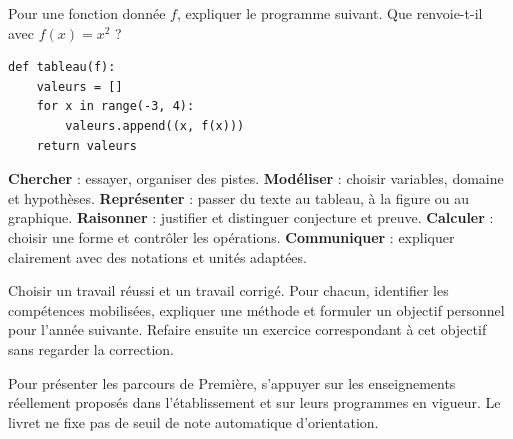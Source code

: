 \begin{example}Pour une fonction donnée $f$, expliquer le programme suivant. Que renvoie-t-il avec $f(x)=x^2$ ?\end{example}
\begin{lstlisting}
def tableau(f):
    valeurs = []
    for x in range(-3, 4):
        valeurs.append((x, f(x)))
    return valeurs
\end{lstlisting}
\begin{keypoint}
\textbf{Chercher} : essayer, organiser des pistes. \textbf{Modéliser} : choisir variables, domaine et hypothèses. \textbf{Représenter} : passer du texte au tableau, à la figure ou au graphique. \textbf{Raisonner} : justifier et distinguer conjecture et preuve. \textbf{Calculer} : choisir une forme et contrôler les opérations. \textbf{Communiquer} : expliquer clairement avec des notations et unités adaptées.
\end{keypoint}
\begin{example}Choisir un travail réussi et un travail corrigé. Pour chacun, identifier les compétences mobilisées, expliquer une méthode et formuler un objectif personnel pour l'année suivante. Refaire ensuite un exercice correspondant à cet objectif sans regarder la correction.\end{example}
\begin{teachernote}Pour présenter les parcours de Première, s'appuyer sur les enseignements réellement proposés dans l'établissement et sur leurs programmes en vigueur. Le livret ne fixe pas de seuil de note automatique d'orientation.\end{teachernote}
